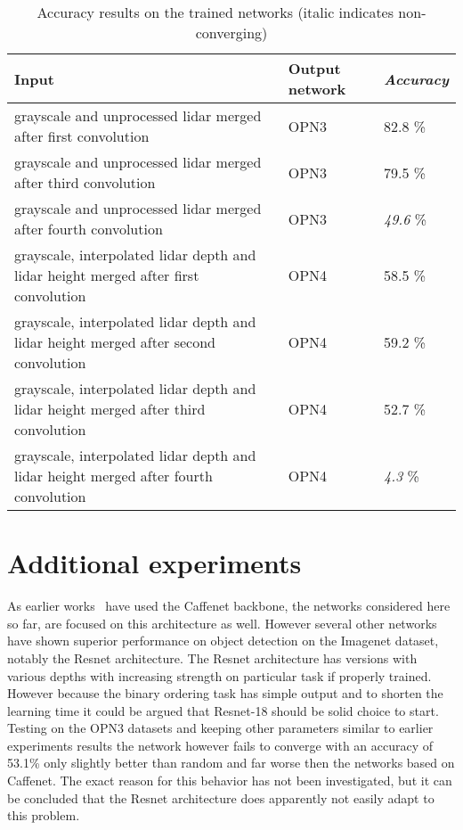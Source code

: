\begin{table}[]
\centering
\caption{Accuracy results on the trained networks (italic indicates non-converging)}
\label{tab:merge_results}
\begin{tabular}{|p{7.5cm}|p{2cm}|p{2cm}|}
\hline
\textbf{Input}                                                          & \textbf{Output network} & \textit{\textbf{Accuracy}} \\ \hline
grayscale and unprocessed lidar merged after first convolution          & OPN3                    & 82.8 \%                   \\ \hline
grayscale and unprocessed lidar merged after third convolution          & OPN3                    & 79.5 \%                   \\ \hline
grayscale and unprocessed lidar merged after fourth convolution         & OPN3                    & \textit{49.6} \%          \\ \hline
grayscale, interpolated lidar depth and lidar height merged after first convolution          & OPN4                    & 58.5 \%                   \\ \hline
grayscale, interpolated lidar depth and lidar height merged after second convolution         & OPN4                    & 59.2 \%                   \\ \hline
grayscale, interpolated lidar depth and lidar height merged after third convolution          & OPN4                    & 52.7 \%                   \\ \hline
grayscale, interpolated lidar depth and lidar height merged after fourth convolution         & OPN4                    & \textit{4.3} \%                   \\ \hline
\end{tabular}
\end{table}

\section{Additional experiments}
As earlier works~\cite{misra2016,lee2017} have used the Caffenet backbone, the networks considered here so far, are focused on this architecture as well. However several other networks have shown superior performance on object detection on the Imagenet dataset, notably the Resnet architecture\cite{he2016}. The Resnet architecture has versions with various depths with increasing strength on particular task if properly trained. However because the binary ordering task has simple output and to shorten the learning time it could be argued that Resnet-18 should be solid choice to start. Testing on the OPN3 datasets and keeping other parameters similar to earlier experiments results the network however fails to converge with an accuracy of 53.1\% only slightly better than random and far worse then the networks based on Caffenet. The exact reason for this behavior has not been investigated, but it can be concluded that the Resnet architecture does apparently not easily adapt to this problem.

